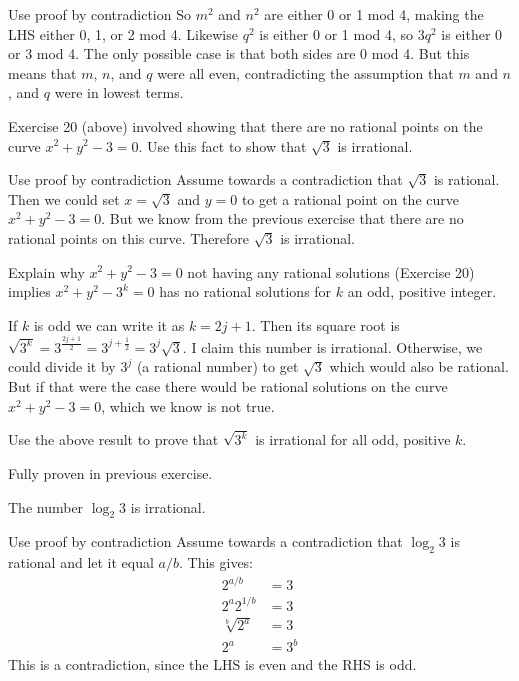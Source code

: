\documentclass{article}
\begin{document}
\begin{solution}{Use proof by contradiction}
  So $m^2$ and $n^2$ are either 0 or 1 mod 4, making the LHS either 0, 1, or 2 mod 4. Likewise $q^2$ is either 0 or 1 mod 4, so $3q^2$ is either 0 or 3 mod 4. The only possible case is that both sides are 0 mod 4. But this means that $m$, $n$, and $q$ were all even, contradicting the assumption that $m$ and $n$, and $q$ were in lowest terms.

\end{solution}

\begin{problem}
Exercise 20 (above) involved showing that there are no rational points on the curve $x^2 + y^2 - 3 = 0$. Use this fact to show that $\sqrt{3}$ is irrational.
\end{problem}
\begin{solution}{Use proof by contradiction}
  Assume towards a contradiction that $\sqrt{3}$ is rational. Then we could set $x = \sqrt{3}$ and $y = 0$ to get a rational point on the curve $x^2 + y^2 - 3 = 0$. But we know from the previous exercise that there are no rational points on this curve. Therefore $\sqrt{3}$ is irrational.
\end{solution}

\begin{problem}
Explain why $x^2 + y^2 - 3 = 0$ not having any rational solutions (Exercise 20) implies $x^2 + y^2 - 3^k = 0$ has no rational solutions for $k$ an odd, positive integer.
\end{problem}
\begin{solution}{}
  If $k$ is odd we can write it as $k = 2j + 1$. Then its square root is $\sqrt{3^k} = 3^{\frac{2j +1}{2}} = 3^{j + \frac{1}{2}} = 3^j \sqrt{3}$.
  I claim this number is irrational. Otherwise, we could divide it by $3^j$ (a rational number) to get $\sqrt{3}$ which would also be rational. But if that were the case there would be rational solutions on the curve $x^2 + y^2 - 3 = 0$, which we know is not true.
\end{solution}
\begin{problem}
Use the above result to prove that $\sqrt{3^k}$ is irrational for all odd, positive $k$.
\end{problem}
\begin{solution}{}
  Fully proven in previous exercise.
\end{solution}

\begin{problem}
The number $\log_2 3$ is irrational.
\end{problem}
\begin{solution}{Use proof by contradiction}
  Assume towards a contradiction that $\log_2 3$ is rational and let it equal $a/b$. This gives:
  \begin{align*}
    2^{a/b}       & = 3   \\
    2^a 2^{1/b}   & = 3   \\
    \sqrt[b]{2^a} & = 3   \\
    2^a           & = 3^b
  \end{align*}
  This is a contradiction, since the LHS is even and the RHS is odd.
\end{solution}
\end{document}
